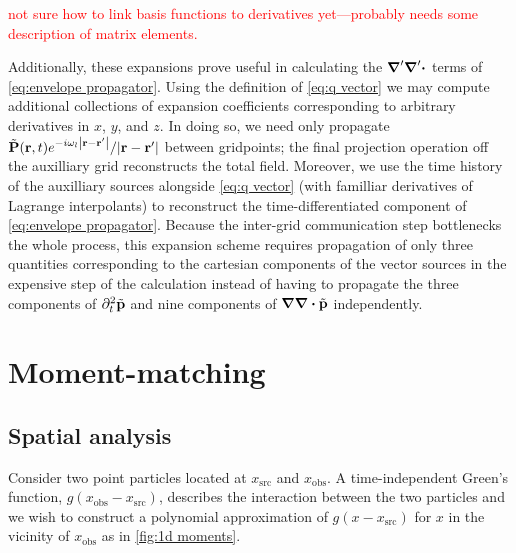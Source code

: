 \textcolor{red}{not sure how to link basis functions to derivatives yet---probably needs some description of matrix elements.}

Additionally, these expansions prove useful in calculating the $\grad' \grad' \boldsymbol{\cdot}$ terms of \cref{eq:envelope propagator}.
Using the definition of \cref{eq:q vector} we may compute additional collections of expansion coefficients corresponding to arbitrary derivatives in $x$, $y$, and $z$.
In doing so, we need only propagate $\tilde{\vb{P}}(\vb{r}, t)e^{-i \omega_l \abs{\vb{r} - \vb{r}'}}/\abs{\vb{r} - \vb{r}'}$ between gridpoints; the final projection operation off the auxilliary grid reconstructs the total field.
Moreover, we use the time history of the auxilliary sources alongside \cref{eq:q vector} (with familliar derivatives of Lagrange interpolants) to reconstruct the time-differentiated component of \cref{eq:envelope propagator}.
Because the inter-grid communication step bottlenecks the whole process, this expansion scheme requires propagation of only three quantities corresponding to the cartesian components of the vector sources in the expensive step of the calculation instead of having to propagate the three components of $\partial_t^2 \tilde{\vb{p}}$ and nine components of $\grad \grad \boldsymbol{\cdot} \tilde{\vb{p}}$ independently.

\section{Moment-matching}

\subsection{Spatial analysis}

Consider two point particles located at $x_\text{src}$ and $x_\text{obs}$.
A time-independent Green's function, $g(x_\text{obs} - x_\text{src})$, describes the interaction between the two particles and we wish to construct a polynomial approximation of $g(x - x_\text{src})$ for $x$ in the vicinity of $x_\text{obs}$ as in \cref{fig:1d moments}.

